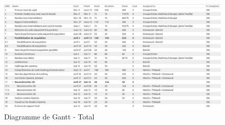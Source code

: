 \newpage

\begin{figure}[!h]
\centering
\includegraphics[scale=0.35, angle=90]{Modules/Picture/tableau_gantt_final}
\caption{Diagramme de Gantt - Total}
\label{ganttTableau}
\end{figure}

\clearpage

\newpage